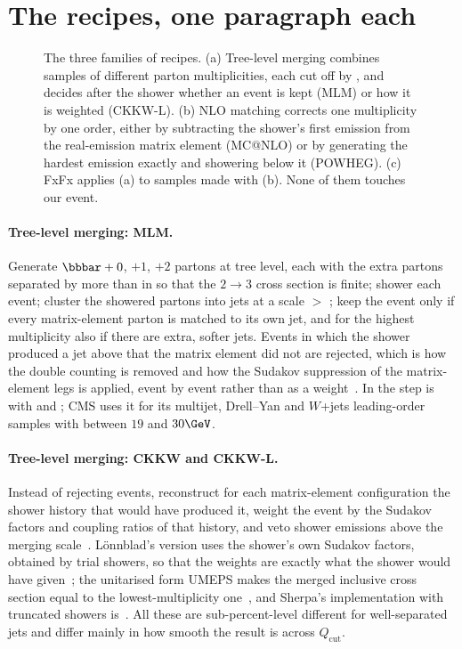\section{The recipes, one paragraph each}
\label{sec:whose_child:recipes}

\begin{figure}[htbp]\centering
\resizebox{\textwidth}{!}{}
\caption[Tree-level merging, NLO matching and FxFx as flow charts]{The three families of recipes. (a) Tree-level merging combines samples of different parton multiplicities, each cut off by , and decides after the shower whether an event is kept (MLM) or how it is weighted (CKKW-L). (b) NLO matching corrects one multiplicity by one order, either by subtracting the shower's first emission from the real-emission matrix element (MC@NLO) or by generating the hardest emission exactly and showering below it (POWHEG). (c) FxFx applies (a) to samples made with (b). None of them touches our event.}
\label{fig:whose_child:recipes}
\end{figure}

\paragraph{Tree-level merging: MLM.} Generate $\bbbar+0$, $+1$, $+2$ partons
at tree level, each with the extra partons separated by more than
 in \kt so that the $2\to3$ cross section is finite; shower
each event; cluster the showered partons into \kt jets at a scale
 $>$ ; keep the event only if every matrix-element
parton is matched to its own jet, and for the highest multiplicity also if
there are extra, softer jets. Events in which the shower produced a jet
above  that the matrix element did not are rejected, which is how
the double counting is removed and how the Sudakov suppression of the
matrix-element legs is applied, event by event rather than as a
weight~\cite{Mangano:2006rw,Alwall:2007fs}. In \PYTHIA the step is
 with  and
; CMS uses it for its \MG multijet, Drell--Yan and
$W$+jets leading-order samples with  between $19$ and $30\GeV$.

\paragraph{Tree-level merging: CKKW and CKKW-L.} Instead of rejecting events,
reconstruct for each matrix-element configuration the shower history that
would have produced it, weight the event by the Sudakov factors and
coupling ratios of that history, and veto shower emissions above the
merging scale~\cite{Catani:2001cc}. L\"onnblad's version uses the
shower's own Sudakov factors, obtained by trial showers, so that the
weights are exactly what the shower would have given~\cite{Lonnblad:2001iq,Lonnblad:2011xx};
the unitarised form UMEPS makes the merged inclusive cross section equal
to the lowest-multiplicity one~\cite{Lonnblad:2012ng}, and Sherpa's
implementation with truncated showers is~\cite{Hoeche:2009rj}. All these
are sub-percent-level different for well-separated jets and differ mainly
in how smooth the result is across $Q_{\mathrm{cut}}$.

